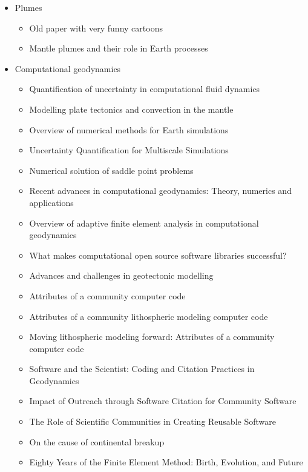 \begin{itemize}
\item Plumes
   \begin{itemize}
   \item[\nineteenseventyseven] Old paper with very funny cartoons \cite{hovo77}
   \item[\twothousandtwentyone] Mantle plumes and their role in Earth processes \cite{kobj21}
   \end{itemize}


\item Computational geodynamics
   \begin{itemize}
   \item [\nineteenninetyseven] Quantification of uncertainty in computational fluid dynamics \cite{roac97}
   \item [\twothousand] Modelling plate tectonics and convection in the mantle \cite{mogz00}
   \item [\twothousandone] Overview of numerical methods for Earth simulations \cite{momd01}
   \item [\twothousandtwo] Uncertainty Quantification for Multiscale Simulations \cite{degg02}
   \item [\twothousandfive] Numerical solution of saddle point problems \cite{begl05}
   \item [\twothousandeight] Recent advances in computational geodynamics: Theory, numerics and applications \cite{kags08}
   \item [\twothousandthirteen] Overview of adaptive finite element analysis in computational geodynamics \cite{masm13}
   \item [\twothousandthirteen] What makes computational open source software libraries successful? \cite{bahe13}
   \item [\twothousandfourteen] Advances and challenges in geotectonic modelling \cite{bufy14}
   \item [\twothousandfifteen] Attributes of a community computer code \cite{comc15}
   \item [\twothousandfifteen] Attributes of a community lithospheric modeling computer code \cite{comc15}
   \item [\twothousandfifteen] Moving lithospheric modeling forward: Attributes of a community computer code \cite{comc15}
   \item [\twothousandseventeen] Software and the Scientist: Coding and Citation Practices in Geodynamics \cite{hwfs17}
   \item [\twothousandnineteen] Impact of Outreach through Software Citation for Community Software \cite{hwpc19}
   \item [\twothousandnineteen] The Role of Scientific Communities in Creating Reusable Software \cite{kehg19}
   \item [\twothousandtwenty] On the cause of continental breakup \cite{niu20}
   \item [\twothousandtwentytwo] Eighty Years of the Finite Element Method: Birth, Evolution, and Future \cite{lilp22}
   \end{itemize}


\end{itemize}
